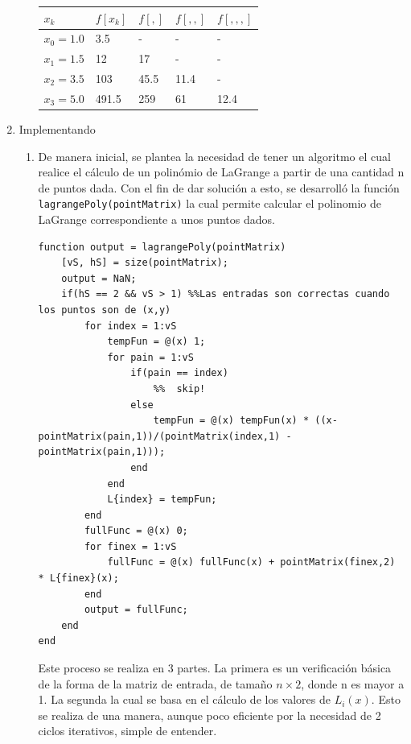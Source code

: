 \documentclass[english,notitlepage,letterpaper, 10pt]{article} %
\begin{document}
\begin{enumerate}
\begin{enumerate}
\begin{center}
\begin{table}[H]
\begin{tabular}{|p{1.5cm}|p{1.5cm}|p{1.5cm}|p{1.5cm}|p{1.5cm}|}
           \hline  
           $x_k$ & $f[x_k]$ & $f[,]$ & $f[,,]$ & $f[,,,]$    \\ \hline
          $x_0 = 1.0$ & 3.5   & -      & -       & -         \\ \hline
          $x_1 = 1.5$ & 12    & 17     & -       & -         \\ \hline
          $x_2 = 3.5$ & 103   & 45.5   & 11.4    & -         \\ \hline
          $x_3 = 5.0$ & 491.5 & 259    & 61      & 12.4      \\ \hline
    
          \end{tabular}
        \end{table}
      \end{center}
      
    \end{enumerate}
    
    \item Implementando
    
    \begin{enumerate}
      \item De manera inicial, se plantea la necesidad de tener un algoritmo el cual realice el cálculo de un polinómio de LaGrange a partir de una cantidad n de puntos dada. Con el fin de dar solución a esto, se desarrolló la función \texttt{lagrangePoly(pointMatrix)} la cual permite calcular el polinomio de LaGrange correspondiente a unos puntos dados.
      
      \begin{lstlisting}
function output = lagrangePoly(pointMatrix)
    [vS, hS] = size(pointMatrix);
    output = NaN;
    if(hS == 2 && vS > 1) %%Las entradas son correctas cuando los puntos son de (x,y)
        for index = 1:vS
            tempFun = @(x) 1;
            for pain = 1:vS
                if(pain == index)
                    %%  skip!
                else
                    tempFun = @(x) tempFun(x) * ((x-pointMatrix(pain,1))/(pointMatrix(index,1) - pointMatrix(pain,1)));
                end
            end
            L{index} = tempFun;
        end
        fullFunc = @(x) 0;
        for finex = 1:vS
            fullFunc = @(x) fullFunc(x) + pointMatrix(finex,2) * L{finex}(x);
        end
        output = fullFunc;
    end
end
      \end{lstlisting}

      Este proceso se realiza en 3 partes. La primera es un verificación básica de la forma de la matriz de entrada, de tamaño $n \times 2$, donde n es mayor a 1. La segunda la cual se basa en el cálculo de los valores de $L_i(x)$. Esto se realiza de una manera, aunque poco eficiente por la necesidad de 2 ciclos iterativos, simple de entender. 


\end{enumerate}
\end{enumerate}
\end{document}
